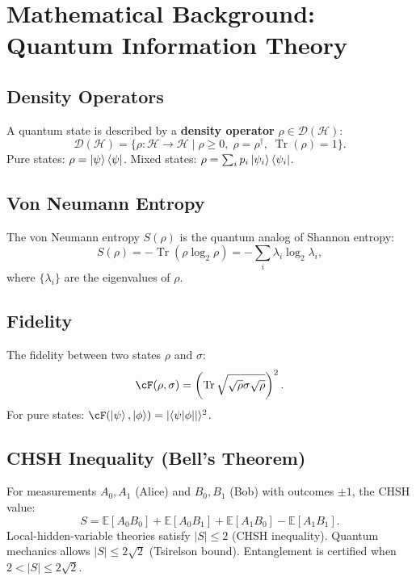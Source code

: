 \documentclass[11pt,a4paper]{article}
\theoremstyle{plain}
\theoremstyle{definition}
\theoremstyle{remark}
\DeclareMathOperator{\Tr}{Tr}
\newcommand{\E}{\mathbb{E}}
\newcommand{\cH}{\mathcal{H}}
\newcommand{\cD}{\mathcal{D}}
\newcommand{\braket}[2]{\langle #1 | #2 \rangle}
\begin{document}
\appendix
\section{Mathematical Background: Quantum Information Theory}
\label{app:math}

\subsection{Density Operators}

A quantum state is described by a \textbf{density operator} $\rho \in \cD(\cH)$:
\[
\cD(\cH) = \{\rho : \cH \to \cH \mid \rho \geq 0,\; \rho = \rho^\dagger,\;
\Tr(\rho) = 1\}.
\]
Pure states: $\rho = \ket{\psi}\bra{\psi}$. Mixed states: $\rho = \sum_i p_i
\ket{\psi_i}\bra{\psi_i}$.

\subsection{Von Neumann Entropy}

The von Neumann entropy $S(\rho)$ is the quantum analog of Shannon entropy:
\[
S(\rho) = -\Tr(\rho \log_2 \rho) = -\sum_i \lambda_i \log_2 \lambda_i,
\]
where $\{\lambda_i\}$ are the eigenvalues of $\rho$.

\subsection{Fidelity}

The fidelity between two states $\rho$ and $\sigma$:
\[
\cF(\rho, \sigma) = \left(\Tr \sqrt{\sqrt{\rho} \sigma \sqrt{\rho}}\right)^2.
\]
For pure states: $\cF(\ket{\psi},\ket{\phi}) = |\braket{\psi|\phi}|^2$.

\subsection{CHSH Inequality (Bell's Theorem)}

For measurements $A_0, A_1$ (Alice) and $B_0, B_1$ (Bob) with outcomes
$\pm 1$, the CHSH value:
\[
S = \E[A_0 B_0] + \E[A_0 B_1] + \E[A_1 B_0] - \E[A_1 B_1].
\]
Local-hidden-variable theories satisfy $|S| \leq 2$ (CHSH inequality).
Quantum mechanics allows $|S| \leq 2\sqrt{2}$ (Tsirelson bound).
Entanglement is certified when $2 < |S| \leq 2\sqrt{2}$.
\end{document}
